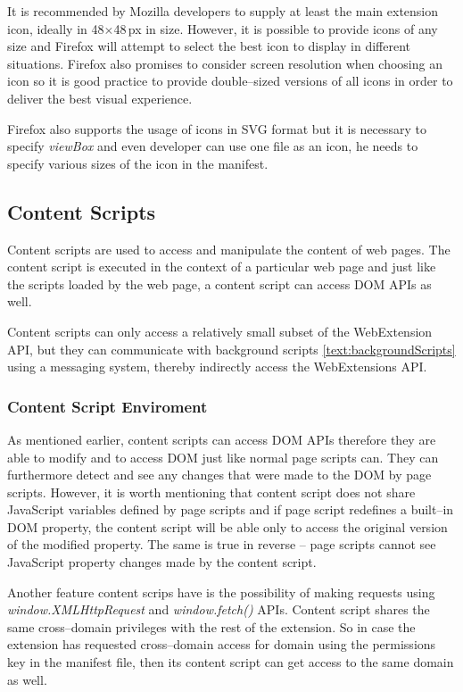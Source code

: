 It is recommended by Mozilla developers to supply at least the main extension icon, ideally in 48$\times$48\,px in size. However, it is possible to provide icons of any size and Firefox will attempt to select the best icon to display in different situations. Firefox also promises to consider screen resolution when choosing an icon so it is good practice to provide double--sized versions of all icons in order to deliver the best visual experience. \cite{extensionIcnos}

Firefox also supports the usage of icons in SVG format but it is necessary to specify \textit{viewBox} and even developer can use one file as an icon, he needs to specify various sizes of the icon in the manifest. \cite{extensionIcnos}

\subsection{Content Scripts}
Content scripts are used to access and manipulate the content of web pages. The content script is executed in the context of a particular web page and just like the scripts loaded by the web page, a content script can access DOM APIs as well.

Content scripts can only access a relatively small subset of the WebExtension API, but they can communicate with background scripts \ref{text:backgroundScripts} using a messaging system, thereby indirectly access the WebExtensions API.

\subsubsection*{Content Script Enviroment}
As mentioned earlier, content scripts can access DOM APIs therefore they are able to modify and to access DOM just like normal page scripts can. They can furthermore detect and see any changes that were made to the DOM by page scripts. However, it is worth mentioning that content script does not share JavaScript variables defined by page scripts and if page script redefines a built--in DOM property, the content script will be able only to access the original version of the modified property. The same is true in reverse -- page scripts cannot see JavaScript property changes made by the content script.

Another feature content scrips have is the possibility of making requests using \textit{window.XMLHttpRequest} and \textit{window.fetch()} APIs. Content script shares the same cross--domain privileges with the rest of the extension. So in case the extension has requested cross--domain access for domain using the permissions key in the manifest file, then its content script can get access to the same domain as well.

